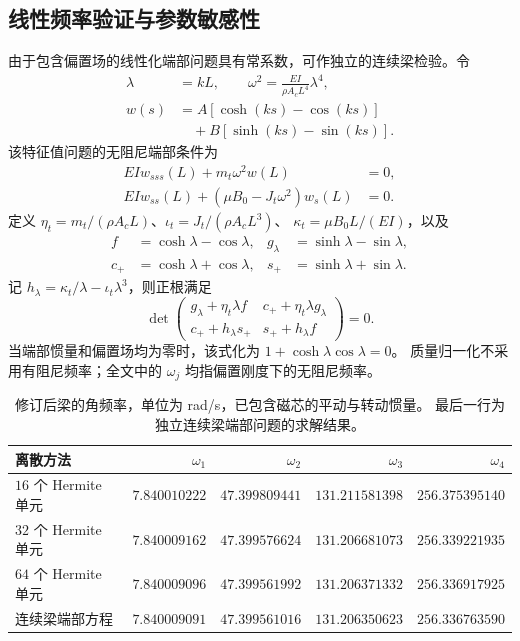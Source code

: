 \subsection{线性频率验证与参数敏感性}
\label{sm:fe-check}
由于包含偏置场的线性化端部问题具有常系数，可作独立的连续梁检验。令
\begin{align}
 \lambda&=kL,\qquad
 \omega^2=\frac{EI}{\rho A_cL^4}\lambda^4,\nonumber\\
 w(s)&=A[\cosh(ks)-\cos(ks)]\nonumber\\
 &\quad+B[\sinh(ks)-\sin(ks)].
 \label{sm:characteristic-shape}
\end{align}
该特征值问题的无阻尼端部条件为
\begin{align}
 EIw_{sss}(L)+m_t\omega^2w(L)&=0,\nonumber\\
 EIw_{ss}(L)+(\mu B_0-J_t\omega^2)w_s(L)&=0.
 \label{sm:characteristic-bc}
\end{align}
定义 $\eta_t=m_t/(\rho A_cL)$、$\iota_t=J_t/(\rho A_cL^3)$、
$\kappa_t=\mu B_0L/(EI)$，以及
\begin{align*}
 f&=\cosh\lambda-\cos\lambda,&
 g_\lambda&=\sinh\lambda-\sin\lambda,\\
 c_+&=\cosh\lambda+\cos\lambda,&
 s_+&=\sinh\lambda+\sin\lambda.
\end{align*}
记 $h_\lambda=\kappa_t/\lambda-\iota_t\lambda^3$，则正根满足
\begin{equation}
 \det\begin{pmatrix}
 g_\lambda+\eta_t\lambda f&
 c_++\eta_t\lambda g_\lambda\\
 c_++h_\lambda s_+&
 s_++h_\lambda f
 \end{pmatrix}=0.
 \label{sm:characteristic-determinant}
\end{equation}
当端部惯量和偏置场均为零时，该式化为 $1+\cosh\lambda\cos\lambda=0$。
质量归一化不采用有阻尼频率；全文中的 $\omega_j$ 均指偏置刚度下的无阻尼频率。

\begin{table}[t]
\centering\small
\caption{修订后梁的角频率，单位为 rad/s，已包含磁芯的平动与转动惯量。
最后一行为独立连续梁端部问题的求解结果。}
\label{sm:frequency-table}
\begin{tabular}{lrrrr}
\toprule
离散方法 & $\omega_1$ & $\omega_2$ & $\omega_3$ & $\omega_4$\\
\midrule
$16$ 个 Hermite 单元 & $7.840010222$ & $47.399809441$ & $131.211581398$ & $256.375395140$\\
$32$ 个 Hermite 单元 & $7.840009162$ & $47.399576624$ & $131.206681073$ & $256.339221935$\\
$64$ 个 Hermite 单元 & $7.840009096$ & $47.399561992$ & $131.206371332$ & $256.336917925$\\
连续梁端部方程 & $7.840009091$ & $47.399561016$ & $131.206350623$ & $256.336763590$\\
\bottomrule
\end{tabular}
\end{table}


